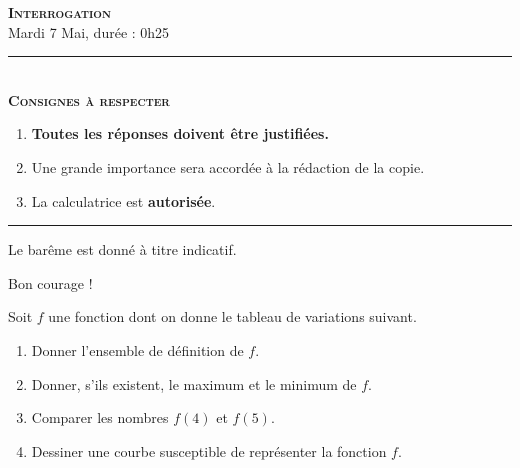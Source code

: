 \documentclass[11pt]{article}
\begin{document}
\begin{center}
\textbf{\LARGE \textsc{Interrogation}}\\[2mm]

{\large Mardi 7 Mai, durée : 0h25}\\[1mm]
\noindent\rule{8cm}{0.4pt}\\[1mm]
\textbf{\textsc{Consignes à respecter}}
\begin{enumerate}[label=\textbf{\arabic*/}]
\item \textbf{Toutes les réponses doivent être justifiées.}
\item Une grande importance sera accordée à la rédaction de la
  copie.
\item La calculatrice est \textbf{autorisée}.
    \end{enumerate}
\noindent\rule{12cm}{0.4pt}
\end{center}

\vspace{2mm}
\noindent Le barême est donné à titre indicatif.
\vspace{2mm}
\begin{center}
  Bon courage !
\end{center}

\begin{exo}[$2,5$ points]
  Soit $f$ une fonction dont on donne le tableau de variations suivant.
 \begin{center}
\end{center}
\begin{enumerate}[leftmargin=*]
  \item Donner l'ensemble de définition de $f$.
  \item Donner, s'ils existent, le maximum et le minimum de $f$.
  \item Comparer les nombres $f(4)$ et $f(5)$.
  \item Dessiner une courbe susceptible de représenter la fonction $f$.
\end{enumerate}
\end{exo}
\end{document}

